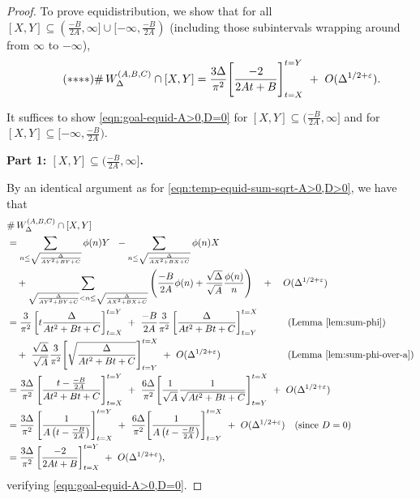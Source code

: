 \documentclass[11pt,letterpaper,reqno]{amsart}
\numberwithin{equation}{section}
\numberwithin{figure}{section}
\numberwithin{table}{section}
\newcommand{\lrp}[1]{\left(#1\right)}
\newcommand{\lrb}[1]{\left[#1\right]}
\begin{document}
\begin{proof}


To prove equidistribution, we show that for all $[X,Y] \subseteq (\frac{-B}{2A},\infty] \cup [-\infty,\frac{-B}{2A})$ (including those subintervals wrapping around from $\infty$ to $-\infty$),
\begin{align} \label{eqn:goal-equid-A>0,D=0} \tag{$*{*}{*}*$}
    \#\, W_{\Delta}^{(A,B,C)} \cap [X,Y] =
    \frac{3\Delta}{\pi^2}
    \Bigg[ 
        \frac{-2}{2At+B}
    \Bigg]_{t=X}^{t=Y} 
         ~+~ O(\Delta^{1/2+\varepsilon}).
\end{align}




It suffices to show \eqref{eqn:goal-equid-A>0,D=0} for $[X,Y] \subseteq (\frac{-B}{2A},\infty]$ and for $[X,Y] \subseteq [-\infty,\frac{-B}{2A})$.

\noindent
\textbf{Part 1: $[X,Y] \subseteq (\frac{-B}{2A},\infty]$.}

By an identical argument as for \eqref{eqn:temp-equid-sum-sqrt-A>0,D>0}, we have that
\begin{align}
    & \#\, W_{\Delta}^{(A,B,C)} \cap [X,Y] \\
    &=
    \sum_{ n \le \sqrt{\frac{\Delta}{AY^2+BY+C}}} 
    \phi(n)Y \ \ - \sum_{ n \le \sqrt{\frac{\Delta}{AX^2+BX+C}}} 
    \phi(n)X \quad  \\
    &\quad+
    \sum_{ \sqrt{\frac{\Delta}{AY^2+BY+C}} < n \le \sqrt{\frac{\Delta}{AX^2+BX+C}} }
    \lrp{
        \frac{-B}{2A} \phi(n) 
        +\frac{\sqrt \Delta}{\sqrt A} \frac{\phi(n)}{n}
    }
    \quad+ \quad O(\Delta^{1/2+\varepsilon}) \\
    &= \frac{3}{\pi^2} \lrb{ t  \frac{\Delta}{At^2+Bt+C}}_{t=X}^{t=Y} ~+~ \frac{-B}{2A}\frac{3}{\pi^2} \lrb{  \frac{\Delta}{At^2+Bt+C}}_{t=Y}^{t=X} \qquad\quad \text{(Lemma \ref{lem:sum-phi})}
    \\
    &\quad +~ \frac{\sqrt \Delta}{\sqrt A} \frac{3}{\pi^2}
        \Bigg[ 
        \sqrt{
            \frac{\Delta}{At^2+Bt+C}    
        }
        \Bigg]_{t=Y}^{t=X} 
    ~+~ O(\Delta^{1/2+\varepsilon})
    \qquad\qquad\qquad\quad\text{(Lemma \ref{lem:sum-phi-over-a})}
    \\
    &= \frac{3\Delta}{\pi^2} \lrb{   \frac{t- \frac{-B}{2A}}{At^2+Bt+C}}_{t=X}^{t=Y} ~+~ 
    \frac{6 \Delta}{\pi^2} 
        \Bigg[ 
            \frac{1}{\sqrt A}
            \frac{1}{\sqrt{At^2+Bt+C}}  
        \Bigg]_{t=Y}^{t=X} ~+~ O(\Delta^{1/2+\varepsilon})
        \\
    &= \frac{3\Delta}{\pi^2} \lrb{    \frac{1}{A\lrp{t - \frac{-B}{2A}}}}_{t=X}^{t=Y} ~+~ 
    \frac{6 \Delta}{\pi^2} 
        \Bigg[ 
            \frac{1}{A\lrp{t- \frac{-B}{2A}}}   
        \Bigg]_{t=Y}^{t=X} ~+~ O(\Delta^{1/2+\varepsilon}) \quad \text{(since $D=0$)}
        \\
    &= \frac{3\Delta}{\pi^2} \lrb{    \frac{-2}{2At+B}}_{t=X}^{t=Y} ~+~ O(\Delta^{1/2+\varepsilon}),
\end{align}
verifying \eqref{eqn:goal-equid-A>0,D=0}.


\end{proof}
\end{document}
